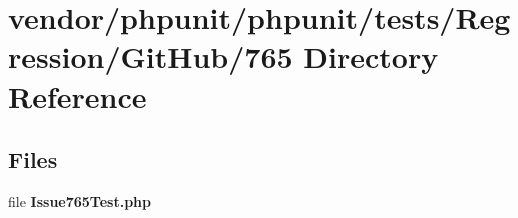 \section{vendor/phpunit/phpunit/tests/\+Regression/\+Git\+Hub/765 Directory Reference}
\label{dir_0df35ce17d234dcb03caff44f74260dc}
\subsection*{Files}
\begin{DoxyCompactItemize}
\item 
file {\bf Issue765\+Test.\+php}
\end{DoxyCompactItemize}
